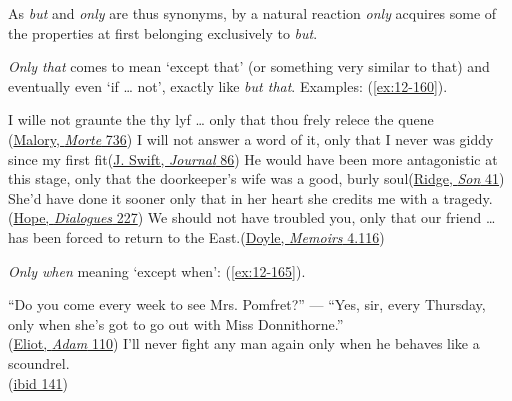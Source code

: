 \bigskip
As \textit{but} and \textit{only} are thus synonyms, by a natural reaction \textit{only} acquires some of the properties at first belonging exclusively to \textit{but}.

\textit{Only that} comes to mean `except that' (or something very similar to that) and eventually even `if {\dots} not', exactly like \textit{but that}. Examples: (\ref{ex:12-160}). 

\ea \label{ex:12-160}
\ea
I wille not graunte the thy lyf {\dots} only that thou frely relece the quene\\\hfill(\href{https://quod.lib.umich.edu/c/cme/MaloryWks2/1:20.7?rgn=div2;view=fulltext#pb.736}{Malory, \textit{Morte} 736}) %
\ex
I will not answer a word of it, only that I never was giddy since my first fit\hfill(\href{https://archive.org/details/journaltostellae00swifuoft/page/86/mode/2up?q=%22not+answer+a+word%22&view=theater}{J. Swift, \textit{Journal} 86})
\ex
He would have been more antagonistic at this stage, only that the doorkeeper's wife was a good, burly soul\hfill(\href{https://www.gutenberg.org/cache/epub/57710/pg57710-images.html#page41}{Ridge, \textit{Son} 41}) %
\ex
She'd have done it sooner only that in her heart she credits me with a tragedy.\hfill(\href{https://archive.org/details/dollydialogues00hope_0/page/168/mode/2up?view=theater&q=%22done+it+sooner%22}{Hope, \textit{Dialogues} 227})
\ex
We should not have troubled you, only that our friend {\dots} has been forced to return to the East.\hfill(\href{https://archive.org/details/memoirsofsherloc00doyliala/page/190/mode/2up?q=%22troubled+you+only+that%22&view=theater}{Doyle, \textit{Memoirs} 4.116}) %
\z
\z

\textit{Only when} meaning `except when': (\ref{ex:12-165}).

\ea \label{ex:12-165}
\ea
``Do you come every week to see Mrs. Pomfret?'' --- ``Yes, sir, every Thursday, only when she's got to go out with Miss Donnithorne.''\\\hfill(\href{https://archive.org/details/adambede00eliouoft/page/n123/mode/2up?q=%22every+thursday%22&view=theater}{Eliot, \textit{Adam} 110}) %
\ex
I'll never fight any man again only when he behaves like a scoundrel.\\\hfill(\href{https://archive.org/details/adambede00eliouoft/page/n155/mode/2up?q=%22fight+any+man%22&view=theater}{ibid 141}) %
\z
\z

